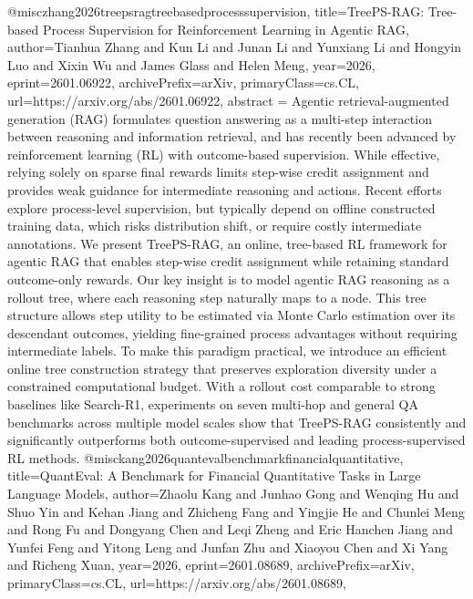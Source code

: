 {}@misc{zhang2026treepsragtreebasedprocesssupervision,
      title={TreePS-RAG: Tree-based Process Supervision for Reinforcement Learning in Agentic RAG}, 
      author={Tianhua Zhang and Kun Li and Junan Li and Yunxiang Li and Hongyin Luo and Xixin Wu and James Glass and Helen Meng},
      year={2026},
      eprint={2601.06922},
      archivePrefix={arXiv},
      primaryClass={cs.CL},
      url={https://arxiv.org/abs/2601.06922},
      abstract = {Agentic retrieval-augmented generation (RAG) formulates question answering as a multi-step interaction between reasoning and information retrieval, and has recently been advanced by reinforcement learning (RL) with outcome-based supervision. While effective, relying solely on sparse final rewards limits step-wise credit assignment and provides weak guidance for intermediate reasoning and actions. Recent efforts explore process-level supervision, but typically depend on offline constructed training data, which risks distribution shift, or require costly intermediate annotations. We present TreePS-RAG, an online, tree-based RL framework for agentic RAG that enables step-wise credit assignment while retaining standard outcome-only rewards. Our key insight is to model agentic RAG reasoning as a rollout tree, where each reasoning step naturally maps to a node. This tree structure allows step utility to be estimated via Monte Carlo estimation over its descendant outcomes, yielding fine-grained process advantages without requiring intermediate labels. To make this paradigm practical, we introduce an efficient online tree construction strategy that preserves exploration diversity under a constrained computational budget. With a rollout cost comparable to strong baselines like Search-R1, experiments on seven multi-hop and general QA benchmarks across multiple model scales show that TreePS-RAG consistently and significantly outperforms both outcome-supervised and leading process-supervised RL methods.}
}@misc{kang2026quantevalbenchmarkfinancialquantitative,
      title={QuantEval: A Benchmark for Financial Quantitative Tasks in Large Language Models}, 
      author={Zhaolu Kang and Junhao Gong and Wenqing Hu and Shuo Yin and Kehan Jiang and Zhicheng Fang and Yingjie He and Chunlei Meng and Rong Fu and Dongyang Chen and Leqi Zheng and Eric Hanchen Jiang and Yunfei Feng and Yitong Leng and Junfan Zhu and Xiaoyou Chen and Xi Yang and Richeng Xuan},
      year={2026},
      eprint={2601.08689},
      archivePrefix={arXiv},
      primaryClass={cs.CL},
      url={https://arxiv.org/abs/2601.08689},
}
